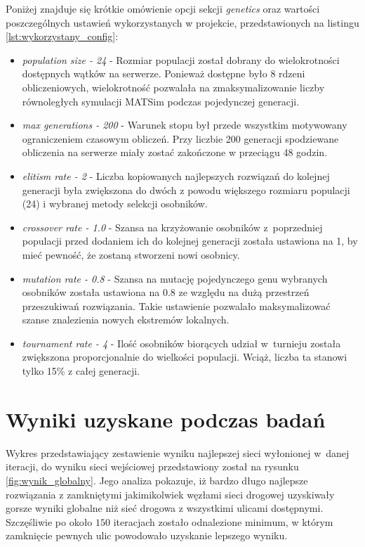 \documentclass[twoside,12pt]{report}
\begin{document}
Poniżej znajduje się krótkie omówienie opcji sekcji \textit{genetics} oraz wartości poszczególnych ustawień wykorzystanych w projekcie, przedstawionych na listingu \ref{lst:wykorzystany_config}:
\begin{itemize}
\item \textit{population size - 24} - Rozmiar populacji został dobrany do wielokrotności dostępnych wątków na serwerze. Ponieważ dostępne było 8 rdzeni obliczeniowych, wielokrotność pozwalała na zmaksymalizowanie liczby równoległych symulacji MATSim podczas pojedynczej generacji.

\item \textit{max generations - 200} - Warunek stopu był przede wszystkim motywowany ograniczeniem czasowym obliczeń. Przy liczbie 200 generacji spodziewane obliczenia na serwerze miały zostać zakończone w przeciągu 48 godzin.

\item \textit{elitism rate - 2} - Liczba kopiowanych najlepszych rozwiązań do kolejnej generacji była zwiększona do dwóch z powodu większego rozmiaru populacji (24) i wybranej metody selekcji osobników.

\item \textit{crossover rate - 1.0} - Szansa na krzyżowanie osobników z~poprzedniej populacji przed dodaniem ich do kolejnej generacji została ustawiona na 1, by mieć pewność, że zostaną stworzeni nowi osobnicy.

\item \textit{mutation rate - 0.8} - Szansa na mutację pojedynczego genu wybranych osobników została ustawiona na 0.8 ze względu na dużą przestrzeń przeszukiwań rozwiązania. Takie ustawienie pozwalało maksymalizować szanse znalezienia nowych ekstremów lokalnych.

\item \textit{tournament rate - 4} - Ilość osobników biorących udział w~turnieju została zwiększona proporcjonalnie do wielkości populacji. Wciąż, liczba ta stanowi tylko 15\% z całej generacji.
\end{itemize}

\section{Wyniki uzyskane podczas badań}

Wykres przedstawiający zestawienie wyniku najlepszej sieci wyłonionej w~danej iteracji, do wyniku sieci wejściowej przedstawiony został na rysunku \ref{fig:wynik_globalny}. Jego analiza pokazuje, iż bardzo długo najlepsze rozwiązania z zamkniętymi jakimikolwiek węzłami sieci drogowej uzyskiwały gorsze wyniki globalne niż sieć drogowa z wszystkimi ulicami dostępnymi. Szczęśliwie po około $150$ iteracjach zostało odnalezione minimum, w którym zamknięcie pewnych ulic powodowało uzyskanie lepszego wyniku.
\end{document}
